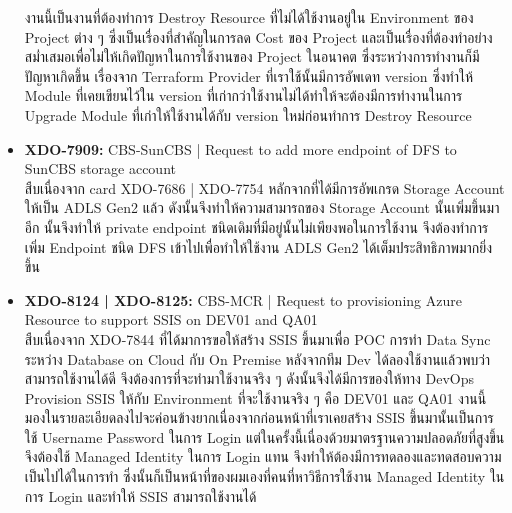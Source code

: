 \begin{itemize}
            งานนี้เป็นงานที่ต้องทำการ Destroy Resource ที่ไม่ได้ใช้งานอยู่ใน Environment ของ Project ต่าง ๆ ซึ่งเป็นเรื่องที่สำคัญในการลด Cost ของ Project และเป็นเรื่องที่ต้องทำอย่างสม่ำเสมอเพื่อไม่ให้เกิดปัญหาในการใช้งานของ Project ในอนาคต ซึ่งระหว่างการทำงานก็มีปัญหาเกิดขึ้น เรื่องจาก Terraform Provider ที่เราใช้นั้นมีการอัพเดท version ซึ่งทำให้ Module ที่เคยเขียนไว้ใน version ที่เก่ากว่าใช้งานไม่ได้ทำให้จะต้องมีการทำงานในการ Upgrade Module ที่เก่าให้ใช้งานได้กับ version ใหม่ก่อนทำการ Destroy Resource
      \item \textbf{XDO-7909:} CBS-SunCBS | Request to add more endpoint of DFS to SunCBS storage account\\
            สืบเนื่องจาก card XDO-7686 | XDO-7754 หลักจากที่ได้มีการอัพเกรด Storage Account ให้เป็น ADLS Gen2 แล้ว ดังนั้นจึงทำให้ความสามารถของ Storage Account นั้นเพิ่มขึ้นมาอีก นั้นจึงทำให้ private endpoint ชนิดเดิมที่มีอยู่นั้นไม่เพียงพอในการใช้งาน จึงต้องทำการเพิ่ม Endpoint ชนิด DFS เข้าไปเพื่อทำให้ใช้งาน ADLS Gen2 ได้เต็มประสิทธิภาพมากยิ่งขึ้น
      \item \textbf{XDO-8124 | XDO-8125:} CBS-MCR | Request to provisioning Azure Resource to support SSIS on DEV01 and QA01\\
            สืบเนื่องจาก XDO-7844 ที่ได้มาการขอให้สร้าง SSIS ขึ้นมาเพื่อ POC การทำ Data Sync ระหว่าง Database on Cloud กับ On Premise หลังจากทีม Dev ได้ลองใช้งานแล้วพบว่าสามารถใช้งานได้ดี จึงต้องการที่จะทำมาใช้งานจริง ๆ ดังนั้นจึงได้มีการของให้ทาง DevOps Provision SSIS ให้กับ Environment ที่จะใช้งานจริง ๆ คือ DEV01 และ QA01 งานนี้มองในรายละเอียดลงไปจะค่อนข้างยากเนื่องจากก่อนหน้าที่เราเคยสร้าง SSIS ขึ้นมานั้นเป็นการใช้ Username Password ในการ Login แต่ในครั้งนี้เนื่องด้วยมาตรฐานความปลอดภัยที่สูงขึ้นจึงต้องใช้ Managed Identity ในการ Login แทน จึงทำให้ต้องมีการทดลองและทดสอบความเป็นไปได้ในการทำ ซึ่งนั้นก็เป็นหน้าที่ของผมเองที่คนที่หาวิธีการใช้งาน Managed Identity ในการ Login และทำให้ SSIS สามารถใช้งานได้
            
\end{itemize}

\clearpage
